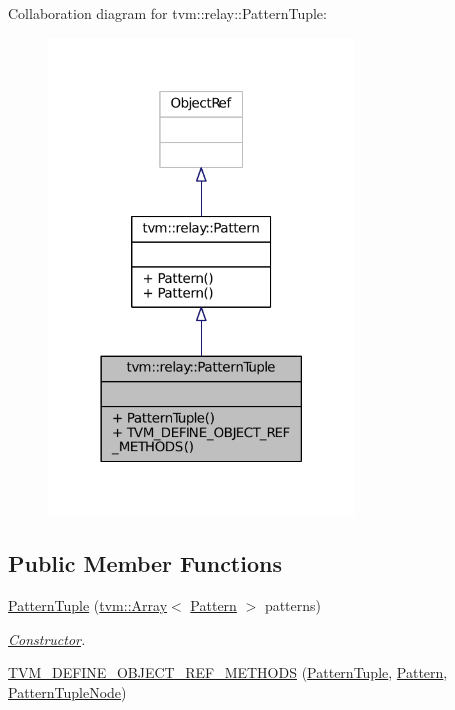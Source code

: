 Collaboration diagram for tvm\+:\+:relay\+:\+:Pattern\+Tuple\+:
\nopagebreak
\begin{figure}[H]
\begin{center}
\leavevmode
\includegraphics[width=230pt]{classtvm_1_1relay_1_1PatternTuple__coll__graph}
\end{center}
\end{figure}
\subsection*{Public Member Functions}
\begin{DoxyCompactItemize}
\item 
\hyperlink{classtvm_1_1relay_1_1PatternTuple_aae0b04503612604b171ff364a4707de7}{Pattern\+Tuple} (\hyperlink{classtvm_1_1Array}{tvm\+::\+Array}$<$ \hyperlink{classtvm_1_1relay_1_1Pattern}{Pattern} $>$ patterns)
\begin{DoxyCompactList}\small\item\em \hyperlink{classtvm_1_1Constructor}{Constructor}. \end{DoxyCompactList}\item 
\hyperlink{classtvm_1_1relay_1_1PatternTuple_a37bca10fd3ae182244b45304dc5d14f5}{T\+V\+M\+\_\+\+D\+E\+F\+I\+N\+E\+\_\+\+O\+B\+J\+E\+C\+T\+\_\+\+R\+E\+F\+\_\+\+M\+E\+T\+H\+O\+DS} (\hyperlink{classtvm_1_1relay_1_1PatternTuple}{Pattern\+Tuple}, \hyperlink{classtvm_1_1relay_1_1Pattern}{Pattern}, \hyperlink{classtvm_1_1relay_1_1PatternTupleNode}{Pattern\+Tuple\+Node})
\end{DoxyCompactItemize}
